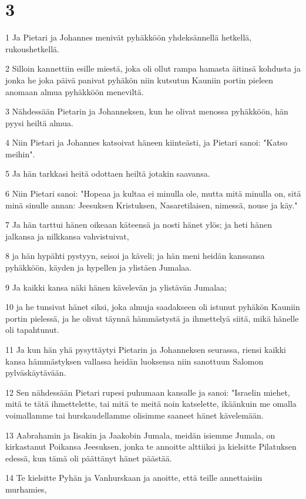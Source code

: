 \chapter{3}

\par 1 Ja Pietari ja Johannes menivät pyhäkköön yhdeksännellä hetkellä, rukoushetkellä.
\par 2 Silloin kannettiin esille miestä, joka oli ollut rampa hamasta äitinsä kohdusta ja jonka he joka päivä panivat pyhäkön niin kutsutun Kauniin portin pieleen anomaan almua pyhäkköön meneviltä.
\par 3 Nähdessään Pietarin ja Johanneksen, kun he olivat menossa pyhäkköön, hän pyysi heiltä almua.
\par 4 Niin Pietari ja Johannes katsoivat häneen kiinteästi, ja Pietari sanoi: "Katso meihin".
\par 5 Ja hän tarkkasi heitä odottaen heiltä jotakin saavansa.
\par 6 Niin Pietari sanoi: "Hopeaa ja kultaa ei minulla ole, mutta mitä minulla on, sitä minä sinulle annan: Jeesuksen Kristuksen, Nasaretilaisen, nimessä, nouse ja käy."
\par 7 Ja hän tarttui hänen oikeaan käteensä ja nosti hänet ylös; ja heti hänen jalkansa ja nilkkansa vahvistuivat,
\par 8 ja hän hypähti pystyyn, seisoi ja käveli; ja hän meni heidän kanssansa pyhäkköön, käyden ja hypellen ja ylistäen Jumalaa.
\par 9 Ja kaikki kansa näki hänen kävelevän ja ylistävän Jumalaa;
\par 10 ja he tunsivat hänet siksi, joka almuja saadakseen oli istunut pyhäkön Kauniin portin pielessä, ja he olivat täynnä hämmästystä ja ihmettelyä siitä, mikä hänelle oli tapahtunut.
\par 11 Ja kun hän yhä pysyttäytyi Pietarin ja Johanneksen seurassa, riensi kaikki kansa hämmästyksen vallassa heidän luoksensa niin sanottuun Salomon pylväskäytävään.
\par 12 Sen nähdessään Pietari rupesi puhumaan kansalle ja sanoi: "Israelin miehet, mitä te tätä ihmettelette, tai mitä te meitä noin katselette, ikäänkuin me omalla voimallamme tai hurskaudellamme olisimme saaneet hänet kävelemään.
\par 13 Aabrahamin ja Iisakin ja Jaakobin Jumala, meidän isiemme Jumala, on kirkastanut Poikansa Jeesuksen, jonka te annoitte alttiiksi ja kielsitte Pilatuksen edessä, kun tämä oli päättänyt hänet päästää.
\par 14 Te kielsitte Pyhän ja Vanhurskaan ja anoitte, että teille annettaisiin murhamies,
